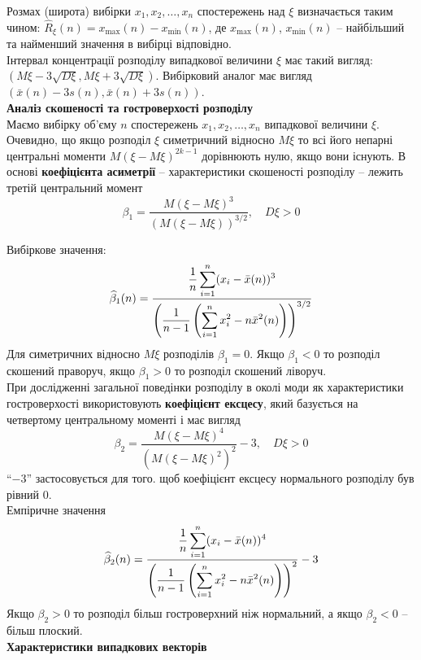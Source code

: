 Розмах (широта) вибірки $x_1, x_2, \ldots, x_n$ спостережень над $\xi$ визначається таким чином: $\widehat{R}_\xi(n) = x_{\max}(n) - x_{\min}(n)$, де $x_{\max}(n)$, $x_{\min}(n)$ -- найбільший та найменший значення в вибірці відповідно. \\

Інтервал концентрації розподілу випадкової величини $\xi$ має такий вигляд: $(M \xi - 3 \sqrt{D \xi}, M \xi + 3 \sqrt{D \xi})$. Вибірковий аналог має вигляд $(\bar{x}(n) - 3 s(n), \bar{x}(n) + 3 s(n))$. \\

\textbf{Аналіз скошеності та гостроверхості розподілу} \\

Маємо вибірку об'єму $n$ спостережень $x_1, x_2, \ldots, x_n$ випадкової величини $\xi$. \\

Очевидно, що якщо розподіл $\xi$ симетричний відносно $M \xi$ то всі його непарні центральні моменти $M(\xi - M \xi)^{2k-1}$ дорівнюють нулю, якщо вони існують. В основі \textbf{коефіцієнта асиметрії} -- характеристики скошеності розподілу -- лежить третій центральний момент \[ \beta_1 = \dfrac{M(\xi - M\xi)^3}{(M(\xi - M \xi))^{3/2}}, \quad D \xi > 0 \]

Вибіркове значення: \[ \widehat{\beta}_1(n) = \dfrac{\dfrac{1}{n} \displaystyle\sum\limits_{i=1}^n(x_i - \bar{x}(n))^3 }{\left( \dfrac{1}{n-1} \left( \displaystyle\sum\limits_{i=1}^n x_i^2 - n \bar{x}^2(n) \right) \right)^{3/2}} \]
Для симетричних відносно $M\xi$ розподілів $\beta_1 = 0$. Якщо $\beta_1 < 0$ то розподіл скошений праворуч, якщо $\beta_1 > 0$ то розподіл скошений ліворуч. \\

При дослідженні загальної поведінки розподілу в околі моди як характеристики гостроверхості використовують \textbf{коефіцієнт ексцесу}, який базується на четвертому центральному моменті і має вигляд
\[ \beta_2 = \dfrac{M (\xi - M \xi)^4}{(M (\xi - M \xi)^2)^2} - 3, \quad D \xi > 0 \]
``$-3$'' застосовується для того. щоб коефіцієнт ексцесу нормального розподілу був рівний 0. \\

Емпіричне значення 
\[ \widehat{\beta}_2(n) = \dfrac{\dfrac{1}{n} \displaystyle\sum\limits_{i=1}^n(x_i - \bar{x}(n))^4 }{\left( \dfrac{1}{n-1} \left( \displaystyle\sum\limits_{i=1}^n x_i^2 - n \bar{x}^2(n) \right) \right)^2} - 3 \]
Якщо $\beta_2 > 0$ то розподіл більш гостроверхний ніж нормальний, а якщо $\beta_2 < 0$ -- більш плоский. \\

\textbf{Характеристики випадкових векторів} \\

